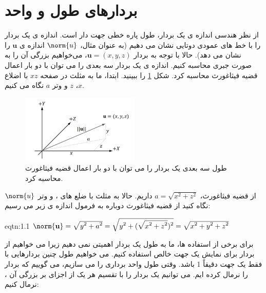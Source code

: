 \section{\textbf{بردارهای طول و واحد}}
\label{sec:1.2}
{
    \Large
    \begin{spacing}{1.5}
        از نظر هندسی اندازه ی یک بردار، طول پاره خطی جهت دار است.
        اندازه ی یک بردار را با خط های عمودی دوتایی نشان می دهیم
        (به عنوان مثال، $\norm{u}$ اندازه ی $\textbf{u}$ را نشان می دهد).
        حالا با توجه به بردار $\textbf{u}=(x,y,z)$، می‌خواهیم بزرگی آن را به صورت جبری محاسبه کنیم.
        اندازه ی یک بردار سه بعدی را می توان با دو بار اعمال قضیه فیثاغورث محاسبه کرد.
        شکل \ref{fig:4.Session.1.1.8} را ببینید. ابتدا، ما به مثلث در صفحه $xz$ با اضلاع $x$، $z$ و وتر $a$ نگاه می کنیم.

        \begin{figure}[H]
            \centering
            \setlength{\belowcaptionskip}{-10pt}
            \includegraphics[width=0.5\textwidth]{Images/4/1/4.Session.1.1.8}
            \caption{طول سه بعدی یک بردار را می توان با دو بار اعمال قضیه فیثاغورث محاسبه کرد.}
            \label{fig:4.Session.1.1.8}
        \end{figure}

        از قضیه فیثاغورث، $a=\sqrt{\displaystyle x^2+z^2}$ داریم.
        حالا به مثلث با ضلع های ،  و وتر $\norm{u}$ نگاه کنید از قضیه فیثاغورث دوباره به فرمول اندازه ی زیر می رسیم:

        \begin{eqtn}{eqtn:1.1}
            \centering
            $\norm{\textbf{u}}=\sqrt{\displaystyle y^2+a^2}=\sqrt{\displaystyle y^2+(\sqrt{\displaystyle x^2+z^2})^2}=\sqrt{\displaystyle x^2+y^2+z^2}$
        \end{eqtn}

        برای برخی از استفاده ها، ما به طول یک بردار اهمیتی نمی دهیم زیرا می خواهیم از بردار برای نمایش یک جهت خالص استفاده کنیم.
        می خواهیم طول چنین بردارهایی با فقط یک جهت دقیقاً 1 باشد.
        وقتی طول واحد برداری را می سازیم، می گوییم که بردار را نرمال کرده ایم.
        می توانیم یک بردار را با تقسیم هر یک از اجزای بر بزرگی آن ، نرمال کنیم:


\end{spacing}}
